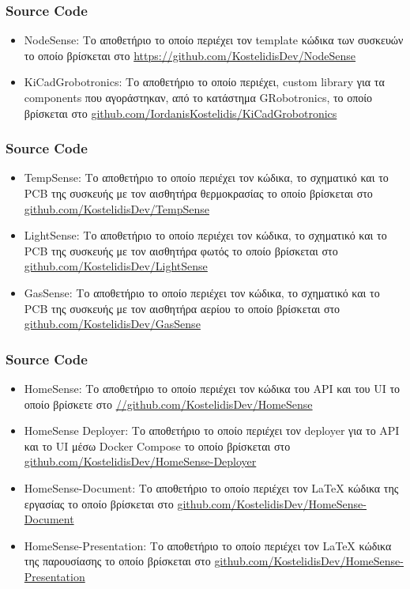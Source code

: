 \documentclass{beamer}
\begin{document}
\begin{frame}
\frametitle{Source Code}
\begin{itemize}
	\item NodeSense: Το αποθετήριο το οποίο περιέχει τον template κώδικα των συσκευών το οποίο βρίσκεται στο \url{https://github.com/KostelidisDev/NodeSense}
	\item KiCadGrobotronics: Το αποθετήριο το οποίο περιέχει, custom library για τα components που αγοράστηκαν, από το κατάστημα GRobotronics, το οποίο βρίσκεται στο \url{github.com/IordanisKostelidis/KiCadGrobotronics}
\end{itemize}
\end{frame}

\begin{frame}
\frametitle{Source Code}
\begin{itemize}
	\item TempSense: Το αποθετήριο το οποίο περιέχει τον κώδικα, το σχηματικό και το PCB της συσκευής με τον αισθητήρα θερμοκρασίας το οποίο βρίσκεται στο \url{github.com/KostelidisDev/TempSense}
	\item LightSense: Το αποθετήριο το οποίο περιέχει τον κώδικα, το σχηματικό και το PCB της συσκευής με τον αισθητήρα φωτός το οποίο βρίσκεται στο \url{github.com/KostelidisDev/LightSense}
	\item GasSense: Το αποθετήριο το οποίο περιέχει τον κώδικα, το σχηματικό και το PCB της συσκευής με τον αισθητήρα αερίου το οποίο βρίσκεται στο \url{github.com/KostelidisDev/GasSense}
\end{itemize}
\end{frame}

\begin{frame}
\frametitle{Source Code}
\begin{itemize}
	\item HomeSense: Το αποθετήριο το οποίο περιέχει τον κώδικα του API και του UI το οποίο βρίσκετε στο \url{//github.com/KostelidisDev/HomeSense}
	\item HomeSense Deployer: Το αποθετήριο το οποίο περιέχει τον deployer για το API και το UI μέσω Docker Compose το οποίο βρίσκεται στο \url{github.com/KostelidisDev/HomeSense-Deployer}
	\item HomeSense-Document: Το αποθετήριο το οποίο περιέχει τον LaTeX κώδικα της εργασίας το οποίο βρίσκεται στο \url{github.com/KostelidisDev/HomeSense-Document}
	\item HomeSense-Presentation: Το αποθετήριο το οποίο περιέχει τον LaTeX κώδικα της παρουσίασης το οποίο βρίσκεται στο \url{github.com/KostelidisDev/HomeSense-Presentation}
\end{itemize}
\end{frame}
\end{document}

